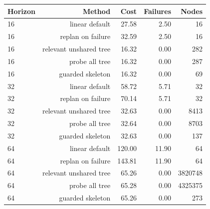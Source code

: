 \begin{tabular}{lrrrr}
\toprule
Horizon & Method & Cost & Failures & Nodes \\
\midrule
16 & linear default & 27.58 & 2.50 & 16 \\
16 & replan on failure & 32.59 & 2.50 & 16 \\
16 & relevant unshared tree & 16.32 & 0.00 & 282 \\
16 & probe all tree & 16.32 & 0.00 & 287 \\
16 & guarded skeleton & 16.32 & 0.00 & 69 \\
\midrule
32 & linear default & 58.72 & 5.71 & 32 \\
32 & replan on failure & 70.14 & 5.71 & 32 \\
32 & relevant unshared tree & 32.63 & 0.00 & 8413 \\
32 & probe all tree & 32.64 & 0.00 & 8703 \\
32 & guarded skeleton & 32.63 & 0.00 & 137 \\
\midrule
64 & linear default & 120.00 & 11.90 & 64 \\
64 & replan on failure & 143.81 & 11.90 & 64 \\
64 & relevant unshared tree & 65.26 & 0.00 & 3820748 \\
64 & probe all tree & 65.28 & 0.00 & 4325375 \\
64 & guarded skeleton & 65.26 & 0.00 & 273 \\
\bottomrule
\end{tabular}
